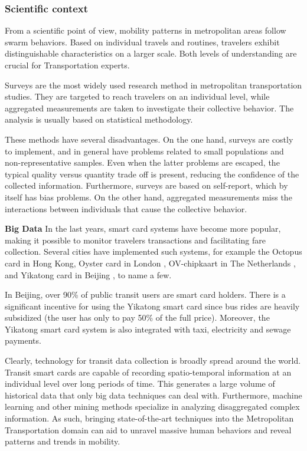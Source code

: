 \documentclass{article}
\begin{document}
\subsubsection{Scientific context}
From a scientific point of view, mobility patterns in metropolitan areas follow swarm behaviors. Based on individual travels and routines, travelers exhibit distinguishable characteristics on a larger scale. Both levels of understanding are crucial for Transportation experts. 

Surveys are the most widely used research method in metropolitan transportation studies. They are targeted to reach travelers on an individual level, while aggregated measurements are taken to investigate their collective behavior. The analysis is usually based on statistical methodology. 

These methods have several disadvantages. On the one hand, surveys are costly to implement, and in general have problems related to small populations and non-representative samples. Even when the latter problems are escaped, the typical quality versus quantity trade off is present, reducing the confidence of the collected information. Furthermore, surveys are based on self-report, which by itself has bias problems. On the other hand, aggregated measurements miss the interactions between individuals that cause the collective behavior. 

\textbf{Big Data}
In the last years, smart card systems have become more popular, making it possible to monitor travelers transactions and facilitating fare collection. Several cities have implemented such systems, for example the Octopus card in Hong Kong\cite{chau2003octopus}, Oyster card in London \cite{blythe2004improving}, OV-chipkaart in The Netherlands \cite{de2008analysis}, and Yikatong card in Beijing \cite{chan2010tactical}, to name a few.

In Beijing, over 90\% of public transit users are smart card holders. There is a significant incentive for using the Yikatong smart card since bus rides are heavily subsidized (the user has only to pay 50\% of the full price)\cite{ma2017understanding}. Moreover, the Yikatong smart card system is also integrated with taxi, electricity and sewage payments. 

Clearly, technology for transit data collection is broadly spread around the world. Transit smart cards are capable of recording spatio-temporal information at an individual level over long periods of time. This generates a large volume of historical data that only big data techniques can deal with. Furthermore, machine learning and other mining methods specialize in analyzing disaggregated complex information. As such, bringing state-of-the-art techniques into the Metropolitan Transportation domain can aid to unravel massive human behaviors and reveal patterns and trends in mobility.
\end{document}
